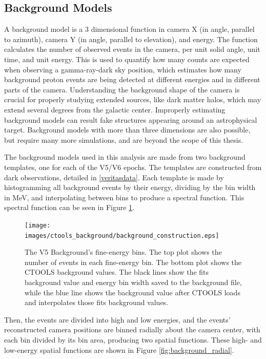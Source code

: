   \subsection{Background Models}\label{background_production}
    A background model is a 3 dimensional function in camera X (in angle, parallel to azimuth), camera Y (in angle, parallel to elevation), and energy.
    The function calculates the number of observed events in the camera, per unit solid angle, unit time, and unit energy.
    This is used to quantify how many counts are expected when observing a gamma-ray-dark sky position, which estimates how many background proton events are being detected at different energies and in different parts of the camera.
    Understanding the background shape of the camera is crucial for properly studying extended sources, like dark matter halos, which may extend several degrees from the galactic center.
    Improperly estimating background models can result fake structures appearing around an astrophysical target.
    Background models with more than three dimensions are also possible, but require many more simulations, and are beyond the scope of this thesis.
    
    The background models used in this analysis are made from two background templates, one for each of the V5/V6 epochs.
    The templates are constructed from dark observations, detailed in \ref{veritasdata}.
    Each template is made by histogramming all background events by their energy, dividing by the bin width in MeV, and interpolating between bins to produce a spectral function.
    This spectral function can be seen in Figure \ref{fig:background_profile}.

    \begin{figure}[ht]
      \centering
      \texttt{[image: images/ctools\_background/background\_construction.eps]}
      \caption[CTOOLS Background Fine Energy Bins]{
        The V5 Background's fine-energy bins.
        The top plot shows the number of events in each fine-energy bin.
        The bottom plot shows the CTOOLS background values.
        The black lines show the fits background value and energy bin width saved to the background file, while the blue line shows the background value after CTOOLS loads and interpolates those fits background values.
      }
      \label{fig:background_profile}
    \end{figure}

    Then, the events are divided into high and low energies, and the events' reconstructed camera positions are binned radially about the camera center, with each bin divided by its bin area, producing two spatial functions.
    These high- and low-energy spatial functions are shown in Figure \ref{fig:background_radial}.
    
